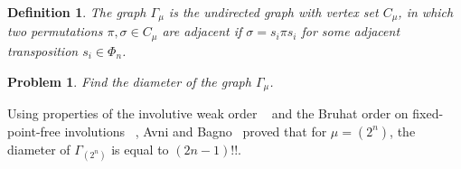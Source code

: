 \documentclass[11pt]{amsart}
\newtheorem{problem}[theorem]{Problem}
\newtheorem{definition}[theorem]{Definition}
\numberwithin{equation}{section}
\newcommand{\todo}[1]{\vspace{5 mm}\par \noindent
\marginpar{\textsc{ToDo}} \framebox{\begin{minipage}[c]{0.95
\textwidth}
 #1 \end{minipage}}\vspace{5 mm}\par}
\newcommand{\dist}{{\operatorname{dist}}}
\newcommand{\D}{{\operatorname{Diameter}}}
\begin{document}
\begin{definition}\label{def:f1}
    The graph $\Gamma_\mu$ is the undirected graph with vertex set $C_\mu$, in which two permutations $\pi, \sigma \in C_\mu$ are adjacent if $\sigma = s_i \pi s_i$ for some adjacent transposition $s_i \in \Phi_n$.     
\end{definition}


\begin{problem}\label{pb:f1}
    Find the diameter of the graph $\Gamma_\mu$.
\end{problem}




Using properties of the involutive weak order %
~\cite[Definition 1.3]{APR}
and the Bruhat order on fixed-point-free involutions%
~\cite{RS, DS, H2, CCT}, 
Avni and Bagno~\cite{Avni-Bagno} proved that 
for  
$\mu=(2^n)$,  
the diameter of $\Gamma_{(2^n)}$ is equal to $(2n-1)!!$. 


\end{document}
